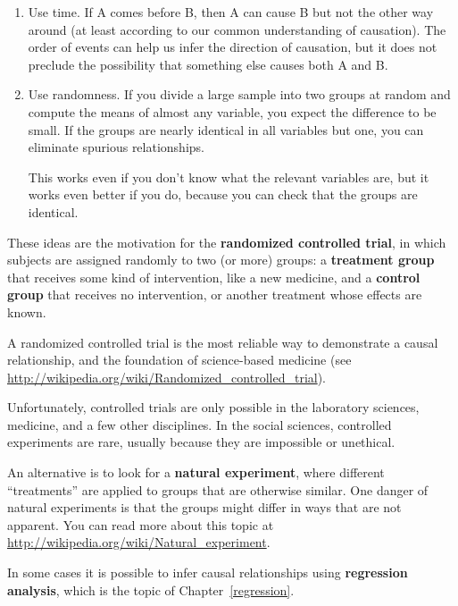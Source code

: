 \documentclass[12pt]{book}
\begin{document}
\begin{enumerate}

\item Use time.  If A comes before B, then A can cause B but not the
  other way around (at least according to our common understanding of
  causation).  The order of events can help us infer the direction
  of causation, but it does not preclude the possibility that something
  else causes both A and B.

\item Use randomness.  If you divide a large sample into two
  groups at random and compute the means of almost any variable, you
  expect the difference to be small.
  If the groups are nearly identical in all variables but one, you
  can eliminate spurious relationships.

  This works even if you don't know what the relevant variables
  are, but it works even better if you do, because you can check that
  the groups are identical.

\end{enumerate}

These ideas are the motivation for the {\bf randomized controlled
trial}, in which subjects are assigned randomly to two (or more)
groups: a {\bf treatment group} that receives some kind of intervention,
like a new medicine, and a {\bf control group} that receives
no intervention, or another treatment whose effects are known.

A randomized controlled trial is the most reliable way to demonstrate
a causal relationship, and the foundation of science-based medicine
(see \url{http://wikipedia.org/wiki/Randomized_controlled_trial}).

Unfortunately, controlled trials are only possible in the laboratory
sciences, medicine, and a few other disciplines.  In the social sciences,
controlled experiments are rare, usually because they are impossible
or unethical.

An alternative is to look for a {\bf natural experiment}, where
different ``treatments'' are applied to groups that are otherwise
similar.  One danger of natural experiments is that the groups might
differ in ways that are not apparent.  You can read more about this
topic at \url{http://wikipedia.org/wiki/Natural_experiment}.

In some cases it is possible to infer causal relationships using {\bf
  regression analysis}, which is the topic of Chapter~\ref{regression}.
\end{document}
